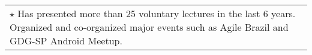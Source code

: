 \documentclass[a4paper, oneside, final]{scrartcl}
\newcommand{\vspc}{\vspace{0.15cm}} %
\begin{document}
\begin{center}
\begin{tabularx}{1\linewidth}{X}
$\star$ Has presented more than 25 voluntary lectures in the last 6 years. Organized and co-organized major events such as Agile Brazil and GDG-SP Android Meetup. \vspc \\









\end{tabularx}
\end{center}
\end{document}
